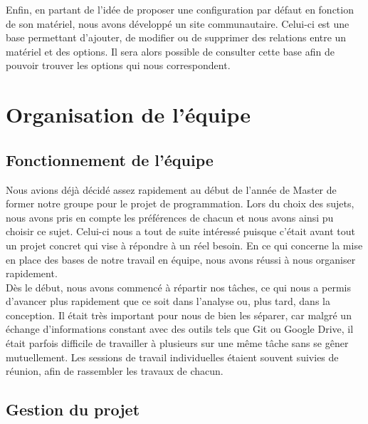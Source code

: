 \documentclass[16pts]{report}
\begin{document}
Enfin, en partant de l'idée de proposer une configuration par défaut en
fonction de son matériel, nous avons développé un site communautaire.  Celui-ci
est une base permettant d'ajouter, de modifier ou de supprimer des relations
entre un matériel et des options. Il sera alors possible de consulter cette
base afin de pouvoir trouver les options qui nous correspondent.  \\

\chapter{Organisation de l'équipe}
\label{cha:Organisation de l'équipe}
    \section{Fonctionnement de l'équipe}
    \label{sec:Fonctionnement de l'équipe}

Nous avions déjà décidé assez rapidement au début de l'année de Master de
former notre groupe pour le projet de programmation. Lors du choix des sujets,
nous avons pris en compte les préférences de chacun et nous avons ainsi pu
choisir ce sujet. Celui-ci nous a tout de suite intéressé puisque c'était avant
tout un projet concret qui vise à répondre à un réel besoin.  En ce qui
concerne la mise en place des bases de notre travail en équipe, nous avons
réussi à nous organiser rapidement.  \\

Dès le début, nous avons commencé à répartir nos tâches, ce qui nous a permis
d’avancer plus rapidement que ce soit dans l’analyse ou, plus tard, dans la
conception. Il était très important pour nous de bien les séparer, car malgré
un échange d’informations constant avec des outils tels que Git ou Google
Drive, il était parfois difficile de travailler à plusieurs sur une même tâche
sans se gêner mutuellement. Les sessions de travail individuelles étaient
souvent suivies de réunion, afin de rassembler les travaux de chacun.  \\


    \section{Gestion du projet}
    \label{sec:Gestion du projet}
\end{document}
